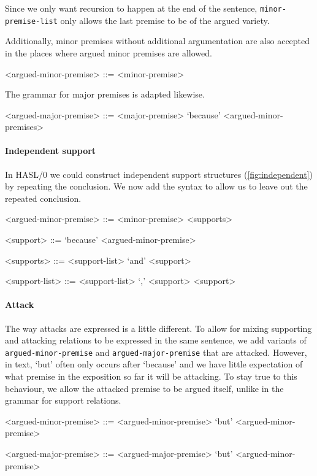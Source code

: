 \noindent Since we only want recursion to happen at the end of the sentence, \texttt{minor-premise-list} only allows the last premise to be of the argued variety.

Additionally, minor premises without additional argumentation are also accepted in the places where argued minor premises are allowed.

\begin{grammar}
<argued-minor-premise> ::= <minor-premise>
\end{grammar}

\noindent The grammar for major premises is adapted likewise.

\begin{grammar}
<argued-major-premise> ::= <major-premise> `because' <argued-minor-premises> %
\end{grammar}

\paragraph{Independent support}
In HASL/0 we could construct independent support structures (\autoref{fig:independent}) by repeating the conclusion. We now add the syntax to allow us to leave out the repeated conclusion.

\begin{grammar}
<argued-minor-premise> ::= <minor-premise> <supports>

<support> ::= `because' <argued-minor-premise>

<supports> ::= <support-list> `and' <support>

<support-list> ::= <support-list> `,' <support>
\alt <support>
\end{grammar}

\paragraph{Attack}
The way attacks are expressed is a little different. To allow for mixing supporting and attacking relations to be expressed in the same sentence, we add variants of \texttt{argued-minor-premise} and \texttt{argued-major-premise} that are attacked. However, in text, `but' often only occurs after `because' and we have little expectation of what premise in the exposition so far it will be attacking. To stay true to this behaviour, we allow the attacked premise to be argued itself, unlike in the grammar for support relations.

\begin{grammar}
<argued-minor-premise> ::= <argued-minor-premise> `but' <argued-minor-premise> %

<argued-major-premise> ::= <argued-major-premise> `but' <argued-minor-premise> %
\end{grammar}

